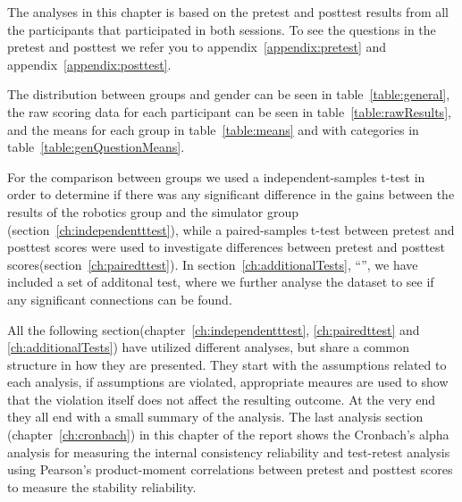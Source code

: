 The analyses in this chapter is based on the pretest and posttest results from all the participants that participated in both sessions. 
To see the questions in the pretest and posttest we refer you to appendix~\ref{appendix:pretest} and appendix~\ref{appendix:posttest}.

\bigskip\noindent
The distribution between groups and gender can be seen in table~\ref{table:general}, the raw scoring data for each participant can be seen in table~\ref{table:rawResults}, and the means for each group in table~\ref{table:means} and with categories in table~\ref{table:genQuestionMeans}. 

\bigskip\noindent
For the comparison between groups we used a independent-samples t-test in order to determine if there was any significant difference in the gains between the results of the robotics group and the simulator group (section~\ref{ch:independentttest}), while a paired-samples t-test between pretest and posttest scores were used to investigate differences between pretest and posttest scores(section~\ref{ch:pairedttest}).
In section~\ref{ch:additionalTests}, "`"', we have included a set of additonal test, where we further analyse the dataset to see if any significant connections can be found. 

\bigskip\noindent
All the following section(chapter~\ref{ch:independentttest}, \ref{ch:pairedttest} and \ref{ch:additionalTests}) have utilized different analyses, but share a common structure in how they are presented.
They start with the assumptions related to each analysis, if assumptions are violated, appropriate meaures are used to show that the violation itself does not affect the resulting outcome.
At the very end they all end with a small summary of the analysis. 
The last analysis section (chapter~\ref{ch:cronbach}) in this chapter of the report shows the Cronbach's alpha analysis for measuring the internal consistency reliability and test-retest analysis using Pearson's product-moment correlations between pretest and posttest scores to measure the stability reliability.

